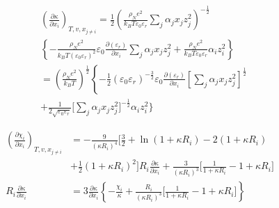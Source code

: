 \documentclass[12pt, letterpaper]{article}
\begin{document}

\begin{equation}
    \begin{aligned}
         & \left(\frac{\partial\kappa}{\partial x_{i}}\right)_{T,v,x_{j\neq i}}=\frac12\left(\frac{\rho_{N}e^{2}}{k_{B}T\varepsilon_{0}\varepsilon_{r}}\sum_{j}\alpha_{j}x_{j}z_{j}^{2}\right)^{-\frac12} \\&\left\{-\frac{\rho_{N}e^2}{k_{B}T\left(\varepsilon_{0}\varepsilon_{r}\right)^2}\varepsilon_{0}\frac{\partial\left(\varepsilon_{r}\right)}{\partial x_{i}}\sum_{j}\alpha_{j}x_{j}z_{j}^2+\frac{\rho_{N}e^2}{k_{B}T\varepsilon_{0}\varepsilon_{r}}\alpha_{i}z_{i}^2\right\}\\&=\left(\frac{\rho_{N}e^{2}}{k_{B}T}\right)^{\frac{1}{2}}\left\{-\frac{1}{2}\left(\varepsilon_{0}\varepsilon_{r}\right)^{-\frac{3}{2}}\varepsilon_{0}\frac{\partial\left(\varepsilon_{r}\right)}{\partial x_{i}}\left[\sum_{j}\alpha_{j}x_{j}z_{j}^{2}\right]^{\frac{1}{2}}\right.\\&+\frac{1}{2\sqrt{\varepsilon_{0}\varepsilon_{r}}}\Bigg[\sum_{j}\alpha_{j}x_{j}z_{j}^2\Bigg]^{-\frac{1}{2}}\alpha_{i}z_{i}^2\Bigg\}
    \end{aligned}
    \label{eq:dkappa_dh_dxi_bjerrum}
\end{equation}


\begin{equation}
    \begin{aligned}
        \left(\frac{\partial\chi_{i}}{\partial x_{i}}\right)_{T,v,x_{j\neq i}} & =-\frac{9}{\left(\kappa R_{i}\right)^{4}}\biggl[\frac{3}{2}+\ln(1+\kappa R_{i})-2(1+\kappa R_{i}) \\&+\frac{1}{2}\left(1+\kappa R_{i}\right)^{2}\bigg]R_{i}\frac{\partial\kappa}{\partial x_{i}}+\frac{3}{\left(\kappa R_{i}\right)^{3}}\bigg[\frac{1}{1+\kappa R_{i}}-1+\kappa R_{i}\bigg]\\R_{i}\frac{\partial\kappa}{\partial x_{i}}&= 3\frac{\partial\kappa}{\partial x_{i}}\left\{-\frac{\chi_{i}}{\kappa}+\frac{R_{i}}{\left(\kappa R_{i}\right)^{3}}\biggl[\frac{1}{1+\kappa R_{i}}-1+\kappa R_{i}\biggr]\right\}
    \end{aligned}
    \label{eq:dchi_dh_dxi_bjerrum}
\end{equation}
\end{document}
